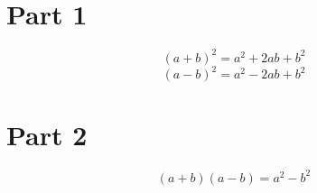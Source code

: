 \documentclass{article}
\numberwithin{equation}{section}  %
\begin{document}
\section{Part 1}
\begin{equation}
(a+b)^2 = a^2 + 2ab + b^2
\end{equation}
\begin{equation}
(a-b)^2 = a^2 - 2ab + b^2
\end{equation}
\section{Part 2}
\begin{equation}
(a+b)(a-b) = a^2 -  b^2
\end{equation}
\end{document}
